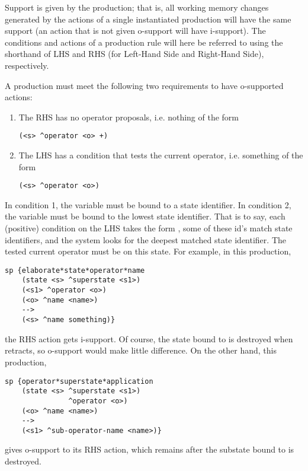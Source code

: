 Support is given by the production; that is, all working memory changes generated by the actions of a single instantiated production will have the same support (an action that is not given o-support will have i-support). The conditions and actions of a production rule will here be referred to using the shorthand of LHS and RHS (for Left-Hand Side and Right-Hand Side), respectively.

A production must meet the following two requirements to have o-supported actions:
\begin{enumerate}
	\item The RHS has no operator proposals, i.e. nothing of the form \begin{verbatim}(<s> ^operator <o> +) \end{verbatim}
	\item The LHS has a condition that tests the current operator, i.e. something of the form
	\begin{verbatim}(<s> ^operator <o>)\end{verbatim}
\end{enumerate}

In condition 1, the variable  must be bound to a state identifier.
In condition 2, the variable  must be bound to the lowest state identifier. That is to say, each (positive) condition on the LHS takes the form , some of these id's match state identifiers, and the system looks for the deepest matched state identifier. The tested current operator must be on this state. For example, in this production,

\begin{verbatim}
sp {elaborate*state*operator*name
    (state <s> ^superstate <s1>)
    (<s1> ^operator <o>)
    (<o> ^name <name>)
    -->
    (<s> ^name something)}
\end{verbatim}

the RHS action gets i-support. Of course, the state bound to  is destroyed when  retracts, so o-support would make little difference. On the other hand, this production,

\begin{verbatim}
sp {operator*superstate*application
    (state <s> ^superstate <s1>)
               ^operator <o>)
    (<o> ^name <name>)
    -->
    (<s1> ^sub-operator-name <name>)}
\end{verbatim}

gives o-support to its RHS action, which remains after the substate bound to  is destroyed.

